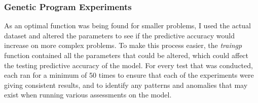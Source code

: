 \documentclass[11pt]{article}
\begin{document}
\subsubsection{Genetic Program Experiments}\label{subsubsec:GPE}
As an optimal function was being found for smaller problems, I used the actual dataset and altered the parameters to see if the predictive accuracy would increase on more complex problems. To make this process easier, the \textit{train\textunderscore gp} function contained all the parameters that could be altered, which could affect the testing predictive accuracy of the model. For every test that was conducted, each ran for a minimum of
50 times to ensure that each of the experiments were giving consistent results, and to identify any patterns and anomalies that may exist when running various assessments on the model.   \\
\end{document}
